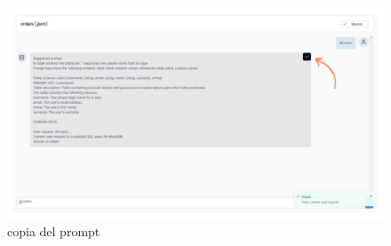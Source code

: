 \begin{figure}[H]
    \centering
    \includegraphics[width=1\textwidth]{assets/copia.png}
    \caption{copia del prompt}
  \end{figure}